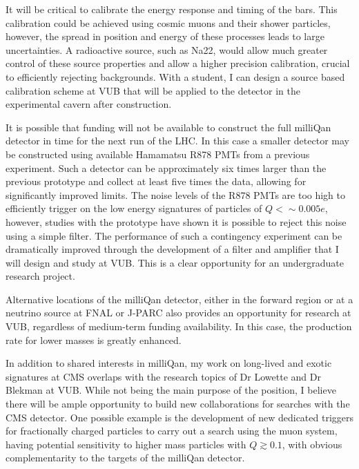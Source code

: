 \documentclass[11pt]{article}
\theoremstyle{plain} \numberwithin{equation}{section}
\theoremstyle{definition}
\begin{document}
It will be critical to calibrate the energy response and timing of the bars. 
This calibration could be achieved using cosmic muons and their shower particles, 
however, the spread in position and energy of these processes
leads to large uncertainties. A radioactive source, such as Na22, would allow much greater control 
of these source properties and allow a higher precision calibration, crucial to efficiently 
rejecting backgrounds. With a student, I can design a source based calibration scheme 
at VUB that will be applied to the detector in the experimental cavern after construction.

It is possible that funding will not be available to construct the full milliQan detector in
time for the next run of the LHC. In this case a smaller 
detector may be constructed using available Hamamatsu R878 PMTs from a previous experiment. 
Such a detector can be approximately six times
larger than the previous prototype and collect at least five times the data, allowing for
significantly improved limits. The noise levels of the R878 PMTs are too high to efficiently 
trigger on the low energy signatures of particles of $Q < \sim 0.005 e$, however, studies with the prototype
have shown it is possible to reject this noise using a simple filter. The performance of
such a contingency experiment can be dramatically improved through the development of a
filter and amplifier that I will design and study at VUB. This is a clear opportunity 
for an undergraduate research project.

Alternative locations of the milliQan detector, either in the forward region or at a neutrino source 
at FNAL or J-PARC also provides an opportunity for research at VUB, 
regardless of medium-term funding availability. In this case, the production rate 
for lower masses is greatly enhanced.

In addition to shared interests in milliQan, my work on long-lived and exotic signatures
at CMS overlaps with the research topics of Dr Lowette and Dr Blekman at VUB. 
While not being the main purpose of the position, I believe there will be ample opportunity
to build new collaborations for searches with the CMS detector. One possible example
is the development of new dedicated triggers for fractionally 
charged particles to carry out a search using the muon system, having potential
sensitivity to higher mass particles with $Q \gtrsim 0.1$, with obvious complementarity 
to the targets of the milliQan detector.
\end{document}
